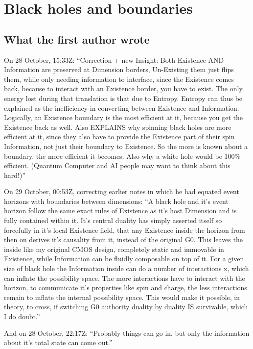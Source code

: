 \documentclass[11pt,a4paper]{article}
\theoremstyle{definition}
\theoremstyle{remark}
\begin{document}
\section{Black holes and boundaries}\label{sec:bh}

\subsection{What the first author wrote}

On 28 October, 15:33Z: ``Correction + new Insight: Both Existence AND Information are preserved at Dimension borders, Un-Existing them just
flips them, while only needing information to interface, since the Existence comes back, because to interact with an Existence border,
you have to exist. The only energy lost during that translation is that due to Entropy. Entropy can thus be explained as the inefficiency
in converting between Existence and Information. Logically, an Existence boundary is the most efficient at it, because you get the
Existence back as well. Also EXPLAINS why spinning black holes are more efficient at it, since they also have to provide the Existence
part of their spin Information, not just their boundary to Existence. So the more is known about a boundary, the more efficient it
becomes. Also why a white hole would be 100\% efficient. (Quantum Computer and AI people may want to think about this hard!)''

On 29 October, 00:53Z, correcting earlier notes in which he had equated event horizons with boundaries between dimensions: ``A black hole
and it's event horizon follow the same exact rules of Existence as it's host Dimension and is fully contained within it. It's central
duality has simply asserted itself so forcefully in it's local Existence field, that any Existence inside the horizon from then on derives
it's causality from it, instead of the original G0. This leaves the inside like my original CMOS design, completely static and immovable
in Existence, while Information can be fluidly composable on top of it. For a given size of black hole the Information inside can do a
number of interactions x, which can inflate the possibility space. The more interactions have to interact with the horizon, to
communicate it's properties like spin and charge, the less interactions remain to inflate the internal possibility space. This would make
it possible, in theory, to cross, if switching G0 authority duality by duality IS survivable, which I do doubt.''

And on 28 October, 22:17Z: ``Probably things can go in, but only the information about it's total state can come out.''
\end{document}
